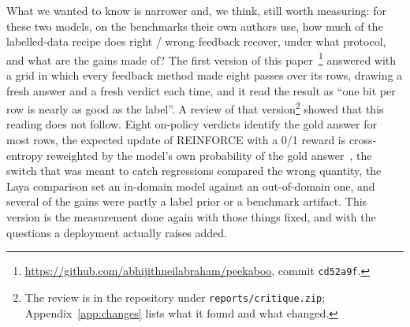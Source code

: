 \documentclass[11pt]{article}
\begin{document}
What we wanted to know is narrower and, we think, still worth measuring: for these two models, on the benchmarks their own authors use, how much of the labelled-data recipe does right / wrong feedback recover, under what protocol, and what are the gains made of? The first version of this paper~\footnote{\url{https://github.com/abhijithneilabraham/peekaboo}, commit \texttt{cd52a9f}.} answered with a grid in which every feedback method made eight passes over its rows, drawing a fresh answer and a fresh verdict each time, and it read the result as ``one bit per row is nearly as good as the label''. A review of that version\footnote{The review is in the repository under \texttt{reports/critique.zip}; Appendix~\ref{app:changes} lists what it found and what changed.} showed that this reading does not follow. Eight on-policy verdicts identify the gold answer for most rows, the expected update of REINFORCE with a 0/1 reward is cross-entropy reweighted by the model's own probability of the gold answer~\citep{zhang2018generalized,davis2025reinforce}, the switch that was meant to catch regressions compared the wrong quantity, the Laya comparison set an in-domain model against an out-of-domain one, and several of the gains were partly a label prior or a benchmark artifact. This version is the measurement done again with those things fixed, and with the questions a deployment actually raises added.
\end{document}
